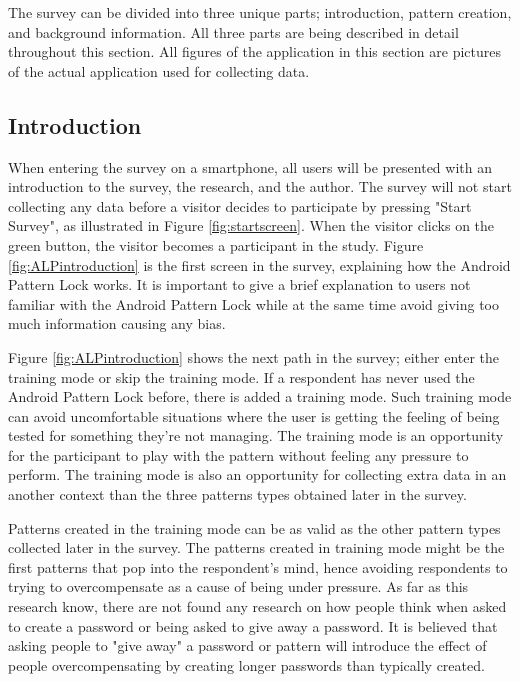   The survey can be divided into three unique parts; introduction, pattern creation, and background information. All three parts are being described in detail throughout this section. All figures of the application in this section are pictures of the actual application used for collecting data.

    \subsection{Introduction}
    When entering the survey on a smartphone, all users will be presented with an introduction to the survey, the research, and the author. The survey will not start collecting any data before a visitor decides to participate by pressing "Start Survey", as illustrated in Figure \ref{fig:startscreen}. When the visitor clicks on the green button, the visitor becomes a participant in the study. Figure \ref{fig:ALPintroduction} is the first screen in the survey, explaining how the Android Pattern Lock works. It is important to give a brief explanation to users not familiar with the Android Pattern Lock while at the same time avoid giving too much information causing any bias.

    Figure \ref{fig:ALPintroduction} shows the next path in the survey; either enter the training mode or skip the training mode. If a respondent has never used the Android Pattern Lock before, there is added a training mode. Such training mode can avoid uncomfortable situations where the user is getting the feeling of being tested for something they're not managing. The training mode is an opportunity for the participant to play with the pattern without feeling any pressure to perform. The training mode is also an opportunity for collecting extra data in an another context than the three patterns types obtained later in the survey.

    Patterns created in the training mode can be as valid as the other pattern types collected later in the survey. The patterns created in training mode might be the first patterns that pop into the respondent's mind, hence avoiding respondents to trying to overcompensate as a cause of being under pressure. As far as this research know, there are not found any research on how people think when asked to create a password or being asked to give away a password. It is believed that asking people to "give away" a password or pattern will introduce the effect of people overcompensating by creating longer passwords than typically created.  

